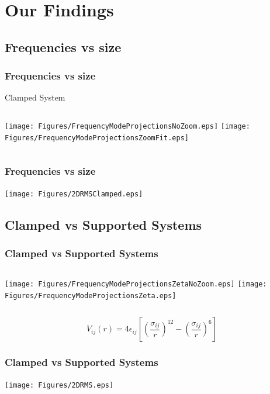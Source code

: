 \documentclass[hyperref={colorlinks=true,urlcolor=blue,linkcolor=.},aspectratio=1610,mathserif]{beamer}
\begin{document}
\section{Our Findings}

\subsection{Frequencies vs size}

\begin{frame}
 \frametitle{Frequencies vs size}
 \begin{center}
  Clamped System
 \end{center}
 \begin{columns}[T]
  \texttt{[image: Figures/FrequencyModeProjectionsNoZoom.eps]}
  \texttt{[image: Figures/FrequencyModeProjectionsZoomFit.eps]}
 \end{columns}
\end{frame}

\begin{frame}
 \frametitle{Frequencies vs size}
 \begin{center}
  \texttt{[image: Figures/2DRMSClamped.eps]}
 \end{center}
\end{frame}

\subsection{Clamped vs Supported Systems}

\begin{frame}
 \frametitle{Clamped vs Supported Systems}
 \begin{columns}[T]
  \texttt{[image: Figures/FrequencyModeProjectionsZetaNoZoom.eps]}
  \texttt{[image: Figures/FrequencyModeProjectionsZeta.eps]}
 \end{columns}
 \begin{equation}
  V_{ij}(r) = 4 \epsilon_{ij} \left[ \left( \frac{\sigma_{ij}}{r} \right) ^{12} - \left( \frac{\sigma_{ij}}{r} \right) ^6 \right] \nonumber
 \end{equation}
\end{frame}

\begin{frame}
 \frametitle{Clamped vs Supported Systems}
 \begin{center}
  \texttt{[image: Figures/2DRMS.eps]}
 \end{center}
\end{frame}
\end{document}
